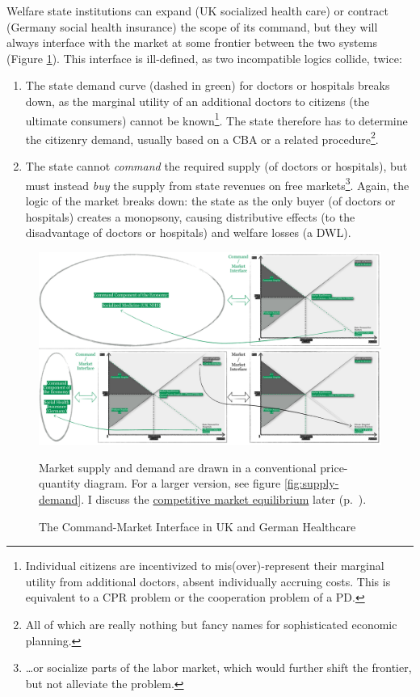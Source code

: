 Welfare state institutions can expand (UK socialized health care) or contract (Germany social health insurance) the scope of its command, but they will always interface with the market at some frontier between the two systems (Figure \ref{fig:interface-command-market-health}). This interface is ill-defined, as two incompatible logics collide, twice: 
\begin{enumerate}
	\item The state demand curve (dashed in green) for doctors or hospitals breaks down, as the marginal utility of an additional doctors to citizens (the ultimate consumers) cannot be known\footnote
		{Individual citizens are incentivized to mis(over)-represent their marginal utility from additional doctors, absent individually accruing costs. This is equivalent to a \gls{CPR} problem or the cooperation problem of a \gls{PD}.}. 
	The state therefore has to determine the citizenry demand, usually based on a \gls{CBA} or a related procedure\footnote
		{All of which are really nothing but fancy names for sophisticated economic planning.}. 
	\item The state cannot \emph{command} the required supply (of doctors or hospitals), but must instead \emph{buy} the supply from state revenues on free markets\footnote{
	\ldots or socialize parts of the labor market, which would further shift the frontier, but not alleviate the problem.
}. 
	Again, the logic of the market breaks down: the state as the only buyer (of doctors or hospitals) creates a monopsony, causing distributive effects (to the disadvantage of doctors or hospitals) and welfare losses (a \gls{DWL}).
\end{enumerate}

\begin{landscape}
 \begin{figure}[htbp]
	\begin{center}
	\includegraphics[width=1\textheight]{./img/interface-command-market-health}  
	\caption[Command-Market Interface in UK and German Healthcare]{The Command-Market Interface in UK and German Healthcare}
	\label{fig:interface-command-market-health}
	\end{center}
	\scriptsize{Market supply and demand are drawn in a conventional price-quantity diagram. For a larger version, see figure \ref{fig:supply-demand}. I discuss the \hyperref[sec:market-solutions-production]{competitive market equilibrium} later (p.~\pageref{sec:market-solutions-production}).}
\end{figure}
\end{landscape}

